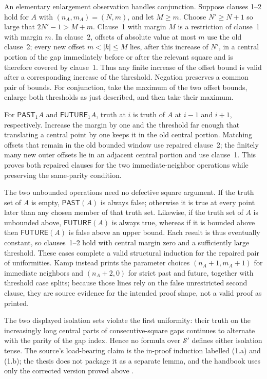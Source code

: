 An elementary enlargement observation handles conjunction.  Suppose clauses
1--2 hold for \(A\) with \((n_A,m_A)=(N,m)\), and let \(M\ge m\).  Choose
\(N'\ge N+1\) so large that \(2N'-1>M+m\).  Clause~1 with margin \(M\) is a
restriction of clause~1 with margin \(m\).  In clause~2, offsets of absolute
value at most \(m\) use the old clause~2; every new offset
\(m<|k|\le M\) lies, after this increase of \(N'\), in a central portion of
the gap immediately before or after the relevant square and is therefore
covered by clause~1.  Thus any finite increase of the offset bound is valid
after a corresponding increase of the threshold.  Negation preserves a
common pair of bounds.  For conjunction, take the maximum of the two offset
bounds, enlarge both thresholds as just described, and then take their
maximum.

For \(\mathsf{PAST}_1 A\) and \(\mathsf{FUTURE}_1 A\), truth at \(i\) is
truth of \(A\) at \(i-1\) and \(i+1\), respectively.  Increase the margin by
one and the threshold far enough that translating a central point by one
keeps it in the old central portion.  Matching offsets that remain in the old
bounded window use repaired clause~2; the finitely many new outer offsets lie
in an adjacent central portion and use clause~1.  This proves both repaired
clauses for the two immediate-neighbor operations while preserving the
same-parity condition.

The two unbounded operations need no defective square argument.  If the
truth set of \(A\) is empty, \(\mathsf{PAST}(A)\) is always false; otherwise
it is true at every point later than any chosen member of that truth set.
Likewise, if the truth set of \(A\) is unbounded above,
\(\mathsf{FUTURE}(A)\) is always true, whereas if it is bounded above then
\(\mathsf{FUTURE}(A)\) is false above an upper bound.  Each result is thus
eventually constant, so clauses~1--2 hold with central margin zero and a
sufficiently large threshold.  These cases complete a valid structural
induction for the repaired pair of uniformities.  Kamp instead prints the
parameter choices \((n_A+1,m_A+1)\) for immediate neighbors and
\((n_A+2,0)\) for strict past and future, together with threshold case
splits; because those lines rely on the false unrestricted second clause,
they are source evidence for the intended proof shape, not a valid proof as
printed.

The two displayed isolation sets violate the first uniformity: their truth on
the increasingly long central parts of consecutive-square gaps continues to
alternate with the parity of the gap index.  Hence no formula over
\(\mathcal S'\) defines either isolation tense.  The source's load-bearing
claim is the in-proof induction labelled (1.a) and (1.b); the thesis does not
package it as a separate lemma, and the handbook uses only the corrected
version proved above
\cite[ch.~IV, pp.~105--108]{Kamp1968}.

